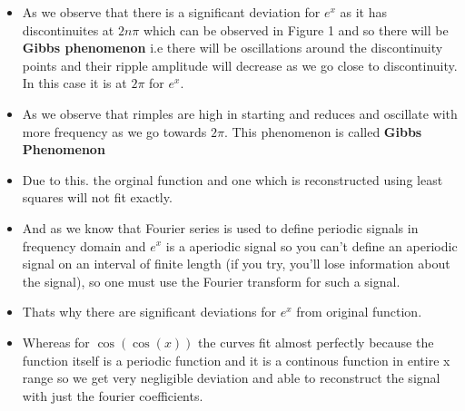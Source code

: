 \documentclass[a4paper]{article}
\providecommand{\tightlist}{%
      \setlength{\itemsep}{0pt}\setlength{\parskip}{0pt}}
\begin{document}
\begin{itemize}
\tightlist
\item
  As we observe that there is a significant deviation for \(e^{x}\) as
  it has discontinuites at \(2n\pi\) which can be observed in Figure 1
  and so there will be \textbf{Gibbs phenomenon} i.e there will be
  oscillations around the discontinuity points and their ripple
  amplitude will decrease as we go close to discontinuity. In this case
  it is at \(2\pi\) for \(e^{x}\).
\item
  As we observe that rimples are high in starting and reduces and
  oscillate with more frequency as we go towards \(2\pi\). This
  phenomenon is called \textbf{Gibbs Phenomenon}
\item
  Due to this. the orginal function and one which is reconstructed using
  least squares will not fit exactly.
\item
  And as we know that Fourier series is used to define periodic signals
  in frequency domain and \(e^{x}\) is a aperiodic signal so you can't
  define an aperiodic signal on an interval of finite length (if you
  try, you'll lose information about the signal), so one must use the
  Fourier transform for such a signal.
\item
  Thats why there are significant deviations for \(e^{x}\) from original
  function.
\item
  Whereas for \(\cos(\cos(x))\) the curves fit almost perfectly because
  the function itself is a periodic function and it is a continous
  function in entire x range so we get very negligible deviation and
  able to reconstruct the signal with just the fourier coefficients.
\end{itemize}


    
    
    
    
\end{document}
